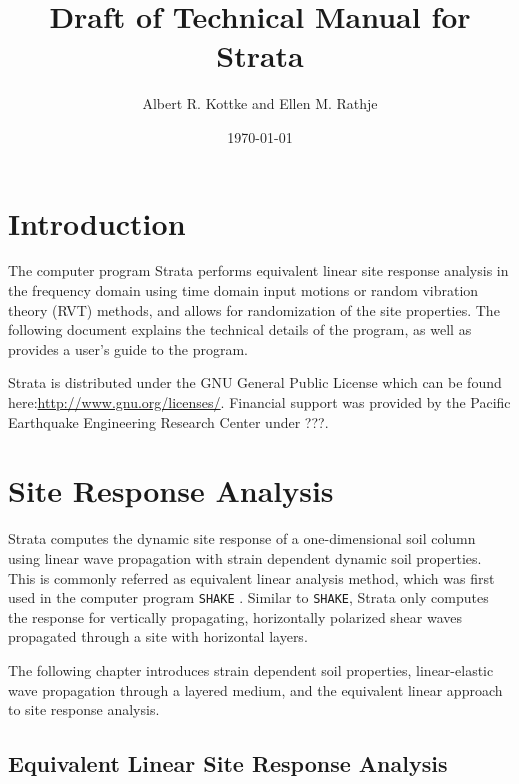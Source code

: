 \documentclass[11pt]{report}
\title{Draft of Technical Manual for Strata}
\author{Albert R. Kottke and Ellen M. Rathje}
\date{\today}
\begin{document}
\maketitle
{}
\tableofcontents
\listoffigures
\listoftables
\clearpage
{}
\setcounter{page}{1}
\chapter{Introduction}
The computer program Strata performs equivalent linear site response analysis in the
frequency domain using time domain input motions or random vibration theory (RVT) methods, and
allows for randomization of the site properties. The following document explains the
technical details of the program, as well as provides a user's guide to the program.

Strata is distributed under the GNU General Public License which can be found
here:\url{http://www.gnu.org/licenses/}. Financial support was provided by the Pacific Earthquake
Engineering Research Center under ???.

\chapter{Site Response Analysis}
Strata computes the dynamic site response of a one-dimensional soil column using linear wave propagation with strain dependent
dynamic soil properties.  This is commonly referred as equivalent linear analysis method, which was first used in
the computer program \texttt{SHAKE} \citep{schnabel:72, shake91}.  Similar to \texttt{SHAKE}, Strata only
computes the response for vertically propagating, horizontally polarized shear waves propagated
through a site with horizontal layers.

The following chapter introduces strain dependent soil properties, linear-elastic wave propagation through a
layered medium, and the equivalent linear approach to site response analysis.

\section{Equivalent Linear Site Response Analysis}
\end{document}
